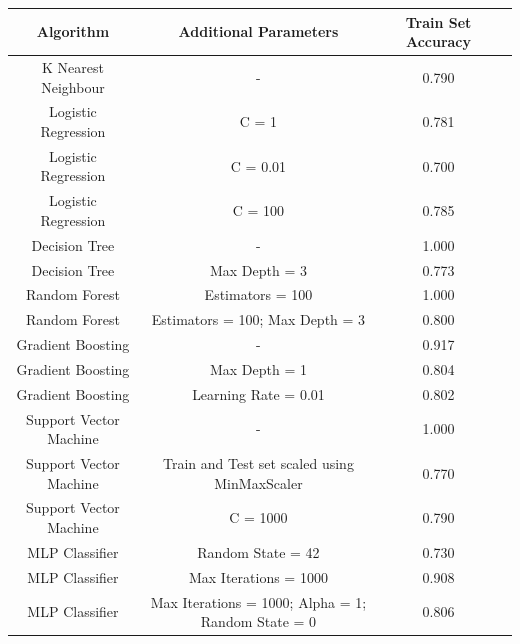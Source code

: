 \documentclass[12pt]{article}
\begin{document}
{
\clearpage
\begin{landscape}
\centering
\begin{table}[]
\centering
\begin{tabular}{|c|c|c|c|}
\hline
Algorithm              & Additional Parameters                              & Train Set Accuracy \\ \hline
K Nearest Neighbour    & -                                                  & 0.790              \\ \hline
Logistic Regression    & C = 1                                              & 0.781              \\ \hline
Logistic Regression    & C = 0.01                                           & 0.700              \\\hline
Logistic Regression    & C = 100                                            & 0.785              \\ \hline
Decision Tree          & -                                                  & 1.000              \\ \hline
Decision Tree          & Max Depth = 3                                      & 0.773              \\ \hline
Random Forest          & Estimators = 100                                   & 1.000              \\ \hline
Random Forest          & Estimators = 100; Max Depth = 3                    & 0.800              \\ \hline
Gradient Boosting      & -                                                  & 0.917              \\ \hline
Gradient Boosting      & Max Depth = 1                                      & 0.804              \\ \hline
Gradient Boosting      & Learning Rate = 0.01                               & 0.802              \\ \hline
Support Vector Machine & -                                                  & 1.000              \\ \hline
Support Vector Machine & Train and Test set scaled using MinMaxScaler       & 0.770              \\ \hline
Support Vector Machine & C = 1000                                           & 0.790              \\ \hline
MLP Classifier         & Random State = 42                                  & 0.730              \\ \hline
MLP Classifier         & Max Iterations = 1000                              & 0.908              \\ \hline
MLP Classifier         & Max Iterations = 1000; Alpha = 1; Random State = 0 & 0.806              \\ \hline
\end{tabular}
\end{table}
\label{table:2}
\end{landscape}
\clearpage
}
\end{document}
